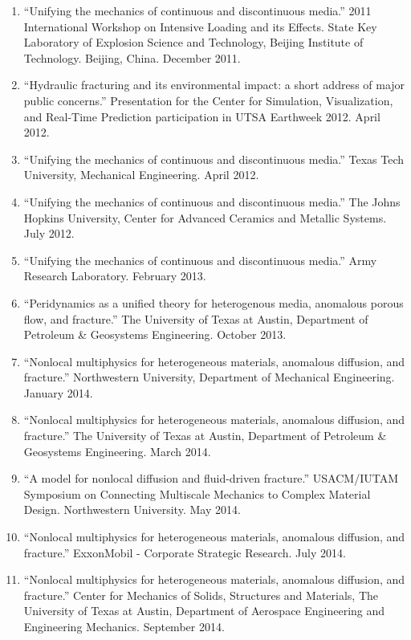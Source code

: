 \begin{enumerate}[resume]
    \item ``Unifying the mechanics of continuous and discontinuous media.''  2011 International Workshop on Intensive Loading and its Effects.  State Key Laboratory of Explosion Science and Technology, Beijing Institute of Technology.  Beijing, China. December 2011.
    \item ``Hydraulic fracturing and its environmental impact: a short address of major public concerns.'' Presentation for the Center for Simulation, Visualization, and Real-Time Prediction participation in UTSA Earthweek 2012.  April 2012.
    \item ``Unifying the mechanics of continuous and discontinuous media.''  Texas Tech University, Mechanical Engineering.  April 2012.
    \item ``Unifying the mechanics of continuous and discontinuous media.''  The Johns Hopkins University, Center for Advanced Ceramics and Metallic Systems.  July 2012.
    \item ``Unifying the mechanics of continuous and discontinuous media.''  Army Research Laboratory.  February 2013.
    \item ``Peridynamics as a unified theory for heterogenous media, anomalous porous flow, and fracture.'' The University of Texas at Austin, Department of Petroleum \& Geosystems Engineering. October 2013.
    \item ``Nonlocal multiphysics for heterogeneous materials, anomalous diffusion, and fracture.'' Northwestern University, Department of Mechanical Engineering. January 2014.
    \item ``Nonlocal multiphysics for heterogeneous materials, anomalous diffusion, and fracture.'' The University of Texas at Austin, Department of Petroleum \& Geosystems Engineering. March 2014.
    \item ``A model for nonlocal diffusion and fluid-driven fracture.'' USACM/IUTAM Symposium on Connecting Multiscale Mechanics to Complex Material Design. Northwestern University. May 2014.
    \item ``Nonlocal multiphysics for heterogeneous materials, anomalous diffusion, and fracture.'' ExxonMobil - Corporate Strategic Research. July 2014.
    \item ``Nonlocal multiphysics for heterogeneous materials, anomalous diffusion, and fracture.'' Center for Mechanics of Solids, Structures and Materials, The University of Texas at Austin, Department of Aerospace Engineering and Engineering Mechanics. September 2014.

\end{enumerate}
